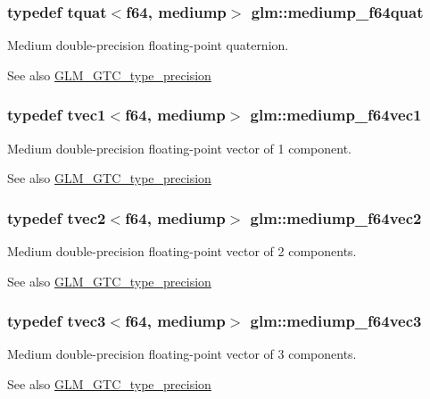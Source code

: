 \subsubsection[{mediump\+\_\+f64quat}]{\setlength{\rightskip}{0pt plus 5cm}typedef {\bf tquat}$<${\bf f64}, mediump$>$ {\bf glm\+::mediump\+\_\+f64quat}}\label{namespaceglm_a9b1e5792ab8cc6a732cae5bd7a9328ec}
Medium double-\/precision floating-\/point quaternion. \begin{DoxySeeAlso}{See also}
\hyperlink{group__gtc__type__precision}{G\+L\+M\+\_\+\+G\+T\+C\+\_\+type\+\_\+precision} 
\end{DoxySeeAlso}
\hypertarget{namespaceglm_a41bd76a5d92f591ee0cd9474a95a4b71}{}
\subsubsection[{mediump\+\_\+f64vec1}]{\setlength{\rightskip}{0pt plus 5cm}typedef tvec1$<${\bf f64}, mediump$>$ {\bf glm\+::mediump\+\_\+f64vec1}}\label{namespaceglm_a41bd76a5d92f591ee0cd9474a95a4b71}
Medium double-\/precision floating-\/point vector of 1 component. \begin{DoxySeeAlso}{See also}
\hyperlink{group__gtc__type__precision}{G\+L\+M\+\_\+\+G\+T\+C\+\_\+type\+\_\+precision} 
\end{DoxySeeAlso}
\hypertarget{namespaceglm_aa99952ddefd80fff0e265598ee70df87}{}
\subsubsection[{mediump\+\_\+f64vec2}]{\setlength{\rightskip}{0pt plus 5cm}typedef tvec2$<${\bf f64}, mediump$>$ {\bf glm\+::mediump\+\_\+f64vec2}}\label{namespaceglm_aa99952ddefd80fff0e265598ee70df87}
Medium double-\/precision floating-\/point vector of 2 components. \begin{DoxySeeAlso}{See also}
\hyperlink{group__gtc__type__precision}{G\+L\+M\+\_\+\+G\+T\+C\+\_\+type\+\_\+precision} 
\end{DoxySeeAlso}
\hypertarget{namespaceglm_aabebaae1dd08feb4ec42f282eeee57ab}{}
\subsubsection[{mediump\+\_\+f64vec3}]{\setlength{\rightskip}{0pt plus 5cm}typedef tvec3$<${\bf f64}, mediump$>$ {\bf glm\+::mediump\+\_\+f64vec3}}\label{namespaceglm_aabebaae1dd08feb4ec42f282eeee57ab}
Medium double-\/precision floating-\/point vector of 3 components. \begin{DoxySeeAlso}{See also}
\hyperlink{group__gtc__type__precision}{G\+L\+M\+\_\+\+G\+T\+C\+\_\+type\+\_\+precision} 
\end{DoxySeeAlso}
\hypertarget{namespaceglm_ae20b112098e50234ede09f15028b9749}{}
